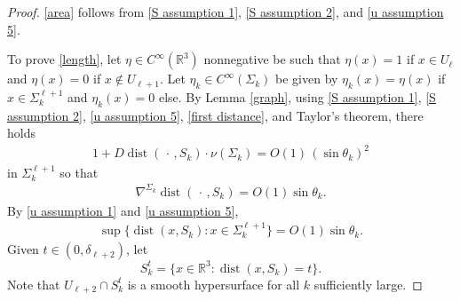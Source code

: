 \documentclass[11pt]{amsart}
\begin{document}
	\begin{proof} 
		\eqref{area} follows from \eqref{S assumption 1}, \eqref{S assumption 2}, and \eqref{u assumption 5}.
		
		To prove \eqref{length}, let $\eta \in C^\infty(\mathbb{R}^3)$  nonnegative be such that $\eta(x)=1$ if $x\in   U_{\ell}$  and $\eta(x)=0$ if $x\notin U_{\ell+1}$. Let $\eta_k\in C^\infty(\Sigma_k)$ be given by $\eta_k(x)=\eta(x)$ if $x\in \Sigma^{\ell+1}_k$ and $\eta_k(x)=0$ else. By Lemma \ref{graph}, using  \eqref{S assumption 1}, \eqref{S assumption 2},  \eqref{u assumption 5}, \eqref{first distance}, and Taylor's theorem, there holds
		\begin{align} \label{distance vs normal 1} 
		1+D\operatorname{dist}(\,\cdot\,,S_k)\cdot \nu(\Sigma_k)=O(1)\,(\sin\theta_k)^2
		\end{align} 
		 in  $\Sigma^{\ell+1}_k$ so that
		\begin{align} \label{distance vs normal 2} 
		\nabla^{\Sigma_k}\operatorname{dist}(\,\cdot\,,S_k)=O(1)\sin\theta_k.
		\end{align} 
		 By \eqref{u assumption 1} and \eqref{u assumption 5}, 
		\begin{align} \label{close}
			\sup\{\operatorname{dist}(x,S_k):x\in \Sigma^{\ell+1}_k\}=O(1)\sin\theta_k.
		\end{align}
	 Given $t\in(0,\delta_{\ell+2})$, let $$S^t_k=\{x\in \mathbb{R}^3:\operatorname{dist}(x,S_k)=t\}.$$ Note that $U_{\ell+2}\cap S^t_k$ is a smooth hypersurface for all $k$  sufficiently large.
	 

\end{proof}
\end{document}
